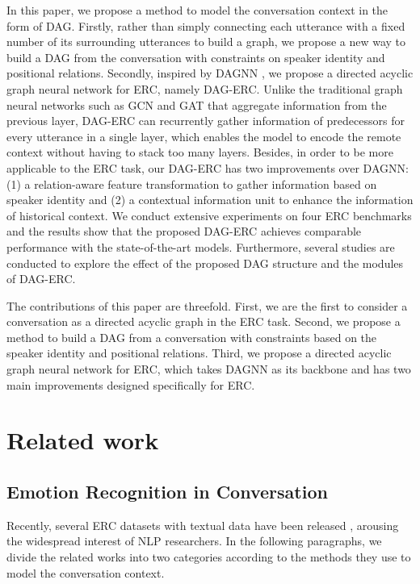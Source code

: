 \documentclass[11pt,a4paper]{article}
\begin{document}
In this paper, we propose a method to model the conversation context in the form of DAG. Firstly, rather than simply connecting each utterance with a fixed number of its surrounding utterances to build a graph, we propose a new way to build a DAG from the conversation with constraints on speaker identity and positional relations. 
Secondly, inspired by DAGNN \citep{thost2021directed}, we propose a directed acyclic graph neural network for ERC, namely DAG-ERC. Unlike the traditional graph neural networks such as GCN \citep{kipf2016semi} and GAT \citep{velivckovic2017graph} that aggregate information from the previous layer, DAG-ERC can recurrently gather information of predecessors for every utterance in a single layer, which enables the model to encode the remote context without having to stack too many layers. Besides, in order to be more applicable to the ERC task, our DAG-ERC has two improvements over DAGNN: (1) a relation-aware feature transformation to gather information based on speaker identity and (2) a contextual information unit to enhance the information of historical context. We conduct extensive experiments on four ERC benchmarks and the results show that the proposed DAG-ERC achieves comparable performance with the state-of-the-art models. Furthermore, several studies are conducted to explore the effect of the proposed DAG structure and the modules of DAG-ERC.

The contributions of this paper are threefold. First, we are the first to consider a conversation as a directed acyclic graph in the ERC task. Second, we propose a method to build a DAG from a conversation with constraints based on the speaker identity and positional relations. Third, we propose a directed acyclic graph neural network for ERC, which takes DAGNN as its backbone and has two main improvements designed specifically for ERC.

\section{Related work}

\subsection{Emotion Recognition in Conversation} 

Recently, several ERC datasets with textual data have been released \citep{busso2008iemocap, schuller2012avec,zahiri2017emotion, li2017dailydialog, chen2018emotionlines, poria2019meld}, arousing the widespread interest of NLP researchers. In the following paragraphs, we divide the related works into two categories according to the methods they use to model the conversation context.
\end{document}
